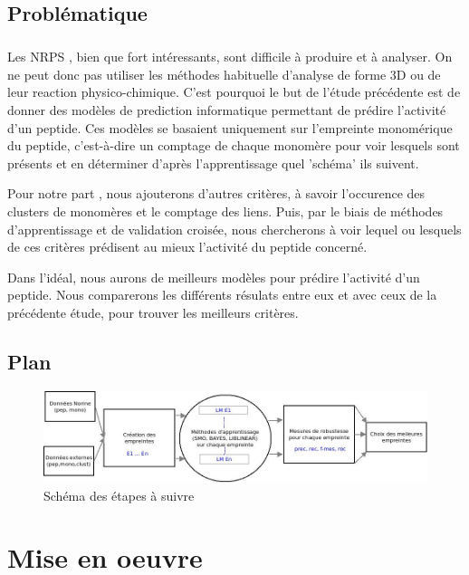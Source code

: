 \documentclass[a4paper,10pt]{report}
\begin{document}
	
	
      \section{Problématique}
	
	\paragraph{}
	  Les NRPS , bien que fort intéressants, sont difficile à produire et à analyser. On ne peut donc pas utiliser les méthodes habituelle d'analyse de forme 3D ou de leur reaction physico-chimique.
	  C'est pourquoi le but de l'étude précédente est de donner des modèles de prediction informatique permettant de prédire l'activité d'un peptide.
	  Ces modèles se basaient uniquement sur l'empreinte monomérique du peptide, c'est-à-dire un comptage de chaque monomère pour voir lesquels sont présents et en déterminer d'après l'apprentissage quel 'schéma' ils suivent.

	  Pour notre part , nous ajouterons d'autres critères, à savoir l'occurence des clusters de monomères et le comptage des liens.
	  Puis, par le biais de méthodes d'apprentissage et de validation croisée, nous chercherons à voir lequel ou lesquels de ces critères prédisent au mieux l'activité du peptide concerné.
	  
	  Dans l'idéal, nous aurons de meilleurs modèles pour prédire l'activité d'un peptide. Nous comparerons les différents résulats entre eux et avec ceux de la précédente étude, pour trouver les meilleurs critères.
	
	
      \section{Plan}
	
	
	  \begin{figure}[hl]
	    \leftskip -2cm
	    \includegraphics[scale = 0.5]{image/Plan.jpeg}
	    \caption{Schéma des étapes à suivre}
	  \end{figure}
	
	 
	  
   
  \chapter{Mise en oeuvre}
\end{document}
